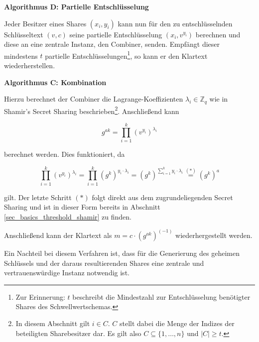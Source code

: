 \textbf{Algorithmus D: Partielle Entschlüsselung}

Jeder Besitzer eines Shares \((x_i, y_i)\) kann nun für den zu entschlüsselnden Schlüsseltext \((v,c)\) seine partielle Entschlüsselung \((x_i, v^{y_i})\) berechnen und diese an eine zentrale Instanz, den Combiner, senden. Empfängt dieser mindestens \(t\) partielle Entschlüsselungen\footnote{
  Zur Erinnerung: \(t\) beschreibt die Mindestzahl zur Entschlüsselung benötigter Shares des Schwellwertschemas.
}, so kann er den Klartext wiederherstellen.

\textbf{Algorithmus C: Kombination}

Hierzu berechnet der Combiner die Lagrange-Koeffizienten \(\lambda_i \in \mathbb{Z}_q\) wie in Shamir's Secret Sharing beschrieben\footnote{
  In diesem Abschnitt gilt \(i \in C\). \(C\) stellt dabei die Menge der Indizes der beteiligten Sharebesitzer dar. Es gilt also \(C \subseteq \{1, \dots, n\}\) und \(| C | \ge t\).
}. Anschließend kann
 
\[g^{ak} = \prod_{i=1}^k (v^{y_i})^{\lambda_i}\]

berechnet werden. Dies funktioniert, da 

\[
\prod_{i=1}^k (v^{y_i})^{\lambda_i} = 
\prod_{i=1}^k (g^k)^{y_i \cdot \lambda_i} = 
(g^k)^{\sum_{i=1}^{k} y_i \cdot \lambda_i} \overset{(*)}{=}
(g^k)^a
\]

gilt. Der letzte Schritt \((*)\) folgt direkt aus dem zugrundeliegenden Secret Sharing und ist in dieser Form bereits in Abschnitt \ref{sec_basics_threshold_shamir} zu finden.

Anschließend kann der Klartext als \(m = c \cdot (g^{ak})^{(-1)}\) wiederhergestellt werden. 



Ein Nachteil bei diesem Verfahren ist, dass für die Generierung des geheimen Schlüssels und der daraus resultierenden Shares eine zentrale und vertrauenswürdige Instanz notwendig ist. 
